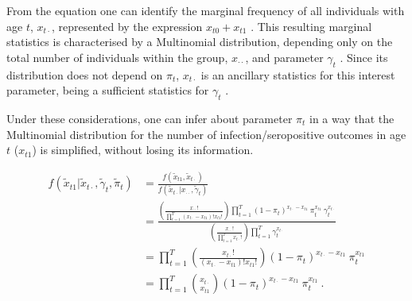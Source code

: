 From the equation one can identify the marginal frequency of all individuals with age $t$, $x_{t\cdot}$, represented by the expression $x_{t0}+x_{t1}$ .
This resulting marginal statistics is characterised by a Multinomial distribution, depending only on the total number of individuals within the group, $x_{\cdot\cdot}$, and parameter $\gamma_t$ .
Since its distribution does not depend on $\pi_t$, $x_{t\cdot}$ is an ancillary statistics for this interest parameter, being a sufficient statistics for $\gamma_t$ \cite{casella2002statistical}.

Under these considerations, one can infer about parameter $\pi_t$ in a way that the Multinomial distribution for the number of infection/seropositive outcomes in age $t$ ($x_{t1}$) is simplified, without losing its information.

\newpage

\begin{equation}
\label{eq:binom}
\begin{split}
f\left(\tilde{x}_{t1} | \tilde{x}_{t\cdot}, \tilde{\gamma}_{t},\tilde{\pi}_{t}\right) &=
\frac{f(\tilde{x}_{t1},\tilde{x}_{t\cdot})} {f(\tilde{x}_{t\cdot} | x_{\cdot\cdot}, \tilde{\gamma}_{t})} \\
& = \frac{\left(\frac{x_{\cdot\cdot}!}{\prod_{t=1}^T (x_{t\cdot}-x_{t1})!x_{t1}!}\right) \prod_{t=1}^T (1-\pi_t)^{x_{t\cdot}-x_{t1}}\ \pi_t^{x_{t1}}\ \gamma_t^{x_{t\cdot}}} {\left(\frac{x_{\cdot\cdot}!}{\prod_{t=1}^T x_{t\cdot}!}\right) \prod_{t=1}^T \gamma_t^{x_{t\cdot}}} \\
& = \prod_{t=1}^T \left(\frac{x_{t\cdot}!}{(x_{t\cdot}-x_{t1})!x_{t1}!}\right) (1-\pi_t)^{x_{t\cdot}-x_{t1}}\ \pi_t^{x_{t1}} \\
& = \prod_{t=1}^T \binom{x_{t\cdot}}{x_{t1}} (1-\pi_t)^{x_{t\cdot}-x_{t1}}\ \pi_t^{x_{t1}}\ .
\end{split}
\end{equation}


